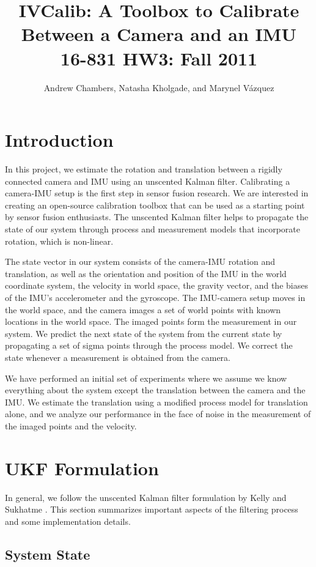 \documentclass[letterpaper]{article}
\title{
  IVCalib: A Toolbox to Calibrate Between a Camera and an IMU\\
  \Large{16-831 HW3: Fall 2011}
}
\author{Andrew Chambers, Natasha Kholgade, and Marynel V\'azquez}
\date{}
\begin{document}
\maketitle

\section{Introduction}

In this project, we estimate the rotation and translation between a rigidly connected camera and IMU using an unscented Kalman filter. Calibrating a camera-IMU setup is the first step in sensor fusion research. We are interested in creating an open-source calibration toolbox that can be used as a starting point by sensor fusion enthusiasts. The unscented Kalman filter helps to propagate the state of our system through process and measurement models that incorporate rotation, which is non-linear.

The state vector in our system consists of the camera-IMU rotation and translation, as well as the orientation and position of the IMU in the world coordinate system, the velocity in world space, the gravity vector, and the biases of the IMU's accelerometer and the gyroscope. The IMU-camera setup moves in the world space, and the camera images a set of world points with known locations in the world space. The imaged points form the measurement in our system. We predict the next state of the system from the current state by propagating a set of sigma points through the process model. We correct the state whenever a measurement is obtained from the camera.

We have performed an initial set of experiments where we assume we know everything about the system except the translation between the camera and the IMU. We estimate the translation using a modified process model for translation alone, and we analyze our performance in the face of noise in the measurement of the imaged points and the velocity.

\section{UKF Formulation}
\label{sec:UKF}

In general, we follow the unscented Kalman filter formulation by Kelly
and Sukhatme \cite{2011:kelly:article}. This section 
summarizes important aspects of the filtering process and some
implementation details.

\subsection{System State}
\end{document}
